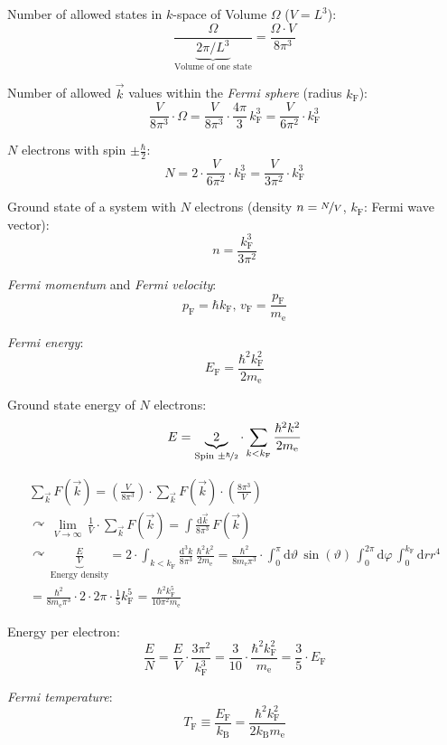 \documentclass[fontsize=11pt,a4paper]{scrartcl}
\begin{document}
Number of allowed states in $k$-space of Volume $\Omega$ ($V=L^3$):
\[
	\frac{\Omega}{\underbrace{2\pi/L^3}_\text{Volume of one state}}=\frac{\Omega\cdot V}{8\pi^3}
\]

Number of allowed $\vec k$ values within the \emph{Fermi sphere} (radius $k_\mathrm{F}$):
\[
	\frac{V}{8\pi^3}\cdot\Omega=\frac{V}{8\pi^3}\cdot\frac{4\pi}{3}\,k_\mathrm{F}^3=\frac{V}{6\pi^2}\cdot k_\mathrm{F}^3
\]

$N$ electrons with spin $\pm\frac{\hbar}{2}$:
\[
	N=2\cdot\frac{V}{6\pi^2}\cdot k_\mathrm{F}^3=\frac{V}{3\pi^2}\cdot k_\mathrm{F}^3
\]

Ground state of a system with $N$ electrons (density $n=\nicefrac{N}{V}$, $k_\mathrm{F}$: Fermi wave vector):
\[
	n=\frac{k_\mathrm{F}^3}{3\pi^2}
\]

\emph{Fermi momentum} and \emph{Fermi velocity}:
\[
	p_\mathrm{F}=\hbar k_\mathrm{F},\,v_\mathrm{F}=\frac{p_\mathrm{F}}{m_\mathrm{e}}
\]

\emph{Fermi energy}:
\[
	E_\mathrm{F}=\frac{\hbar^2 k_\mathrm{F}^2}{2m_\mathrm{e}}
\]

Ground state energy of $N$ electrons:
\[
	E=\underbrace{2}_{\text{Spin }\pm\nicefrac{\hbar}{2}}\cdot\sum_{k<k_\mathrm{F}}\frac{\hbar^2 k^2}{2m_\mathrm{e}}
\]

\begin{gather*}
	\sum_{\vec k}F(\vec k)=\left(\frac{V}{8\pi^3}\right)\cdot\sum_{\vec k}F(\vec k)\cdot\left(\frac{8\pi^3}{V}\right)\\
	\curvearrowright\,\lim_{V\to\infty}\,\frac{1}{V}\cdot\sum_{\vec k}F(\vec k)=\int\frac{\mathrm{d}\vec k}{8\pi^3}\,F(\vec k)\\
	\curvearrowright\,\underbrace{\frac{E}{V}}_\text{Energy density}=2\cdot\int_{k<k_\mathrm{F}}\frac{\mathrm{d}^3 k}{8\pi^3}\,\frac{\hbar^2 k^2}{2m_\mathrm{e}}=\frac{\hbar^2}{8m_\mathrm{e}\pi^3}\cdot\int_0^\pi\mathrm{d}\vartheta\,\sin(\vartheta)\,\int_0^{2\pi}\mathrm{d}\varphi\,\int_0^{k_\mathrm{F}}\mathrm{d}r r^4\\
	=\frac{\hbar^2}{8m_\mathrm{e}\pi^3}\cdot 2\cdot 2\pi\cdot\frac{1}{5}k_\mathrm{F}^5=\frac{\hbar^2 k_\mathrm{F}^5}{10\pi^2 m_\mathrm{e}}
\end{gather*}

Energy per electron:
\[
	\frac{E}{N}=\frac{E}{V}\cdot\frac{3\pi^2}{k_\mathrm{F}^3}=\frac{3}{10}\cdot\frac{\hbar^2 k_\mathrm{F}^2}{m_\mathrm{e}}=\frac{3}{5}\cdot E_\mathrm{F}
\]

\emph{Fermi temperature}:
\[
	T_\mathrm{F}\equiv\frac{E_\mathrm{F}}{k_\mathrm{B}}=\frac{\hbar^2 k_\mathrm{F}^2}{2k_\mathrm{B} m_\mathrm{e}}
\]
\end{document}

